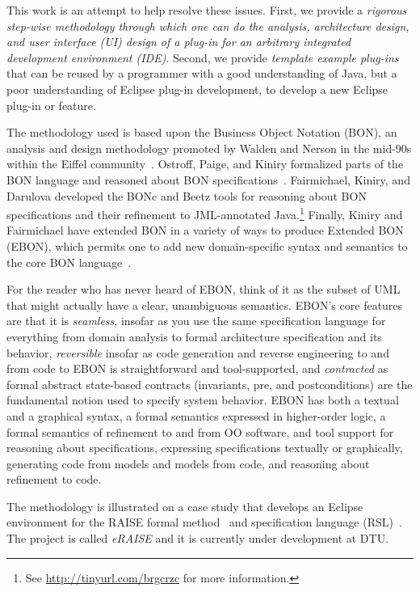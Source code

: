 \documentclass[conference]{IEEEtran}
\begin{document}
This work is an attempt to help resolve these issues.  First, we
provide a \emph{rigorous step-wise methodology through which one can
  do the analysis, architecture design, and user interface (UI) design
  of a plug-in for an arbitrary integrated development environment
  (IDE)}.  Second, we provide \emph{template example plug-ins} that
can be reused by a programmer with a good understanding of Java, but a
poor understanding of Eclipse plug-in development, to develop a new
Eclipse plug-in or feature.

The methodology used is based upon the Business Object Notation (BON),
an analysis and design methodology promoted by Walden and Nerson in
the mid-90s within the Eiffel community~\cite{WaldenNerson95}.
Ostroff, Paige, and Kiniry formalized parts of the BON language and
reasoned about BON
specifications~\cite{LancaricOstroffPaige02,EBON01,PaigeEtal02,PaigeOstroff01b}.
Fairmichael, Kiniry, and Darulova developed the BONc and Beetz tools
for reasoning about BON specifications and their refinement to
JML-annotated Java.\footnote{See \url{http://tinyurl.com/brgcrzc} for
  more information.}  Finally, Kiniry and Fairmichael have extended
BON in a variety of ways to produce Extended BON (EBON), which permits
one to add new domain-specific syntax and semantics to the core BON
language~\cite{Kiniry02-PhDThesis}.

For the reader who has never heard of EBON, think of it as the subset
of UML that might actually have a clear, unambiguous semantics.
EBON's core features are that it is \emph{seamless}, insofar as you
use the same specification language for everything from domain
analysis to formal architecture specification and its behavior,
\emph{reversible} insofar as code generation and reverse engineering
to and from code to EBON is straightforward and tool-supported, and
\emph{contracted} as formal abstract state-based contracts
(invariants, pre, and postconditions) are the fundamental notion used
to specify system behavior.  EBON has both a textual and a graphical
syntax, a formal semantics expressed in higher-order logic, a formal
semantics of refinement to and from OO software, and tool support for
reasoning about specifications, expressing specifications textually or
graphically, generating code from models and models from code, and
reasoning about refinement to code.

The methodology is illustrated on a case study that develops an
Eclipse environment for the RAISE formal method~\cite{RMG95} and
specification language (RSL)~\cite{RLG92}. The project is called
\emph{eRAISE} and it is currently under development at DTU.
\end{document}
